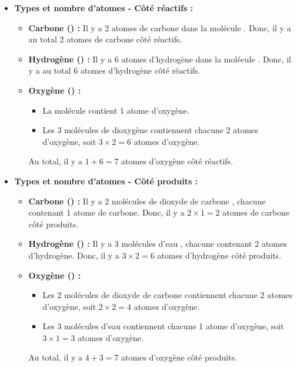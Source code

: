\documentclass[a4paper,12pt]{article}
\begin{document}
\begin{itemize}
\item \textbf{Types et nombre d'atomes - Côté réactifs :}
  \begin{itemize}
    \item \textbf{Carbone () :} Il y a 2 atomes de carbone dans la molécule . Donc, il y a au total 2 atomes de carbone côté réactifs.
    \item \textbf{Hydrogène () :} Il y a 6 atomes d'hydrogène dans la molécule . Donc, il y a au total 6 atomes d'hydrogène côté réactifs.
    \item \textbf{Oxygène () :} 
      \begin{itemize}
        \item La molécule  contient 1 atome d'oxygène.
        \item Les 3 molécules de dioxygène  contiennent chacune 2 atomes d'oxygène, soit \(3 \times 2 = 6\) atomes d'oxygène.
      \end{itemize}
      Au total, il y a \(1 + 6 = 7\) atomes d'oxygène côté réactifs.
  \end{itemize}

\item \textbf{Types et nombre d'atomes - Côté produits :}
  \begin{itemize}
    \item \textbf{Carbone () :} Il y a 2 molécules de dioxyde de carbone , chacune contenant 1 atome de carbone. Donc, il y a \(2 \times 1 = 2\) atomes de carbone côté produits.
    \item \textbf{Hydrogène () :} Il y a 3 molécules d'eau , chacune contenant 2 atomes d'hydrogène. Donc, il y a \(3 \times 2 = 6\) atomes d'hydrogène côté produits.
    \item \textbf{Oxygène () :} 
      \begin{itemize}
        \item Les 2 molécules de dioxyde de carbone  contiennent chacune 2 atomes d'oxygène, soit \(2 \times 2 = 4\) atomes d'oxygène.
        \item Les 3 molécules d'eau  contiennent chacune 1 atome d'oxygène, soit \(3 \times 1 = 3\) atomes d'oxygène.
      \end{itemize}
      Au total, il y a \(4 + 3 = 7\) atomes d'oxygène côté produits.
  \end{itemize}
\end{itemize}
\end{document}
